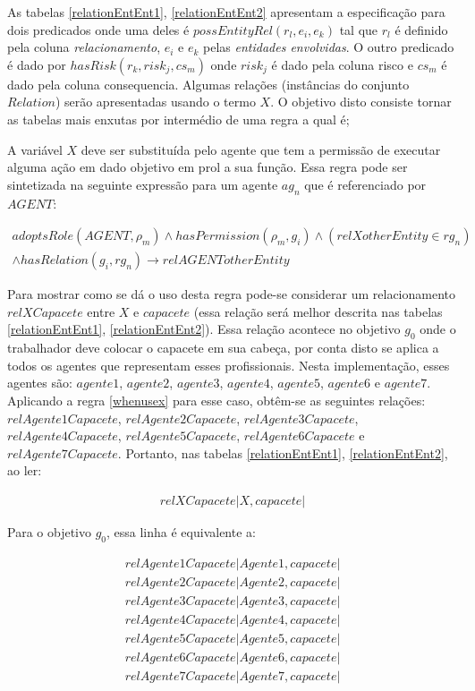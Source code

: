As tabelas \ref{relationEntEnt1}, \ref{relationEntEnt2} apresentam a especificação para dois predicados onde uma deles é $possEntityRel(r_l,e_i,e_k)$ 
tal que $r_l$ é definido pela coluna \textit{relacionamento}, $e_i$ e $e_k$ pelas \textit{entidades envolvidas}. 
O outro predicado é dado por $hasRisk(r_k,risk_j,cs_m)$ onde $risk_j$ é dado pela coluna risco e $cs_m$ é dado pela coluna consequencia. 
Algumas relações (instâncias do conjunto $Relation$) serão apresentadas usando o termo $X$. O objetivo disto consiste tornar as tabelas mais enxutas por intermédio de uma regra a qual é; 

A variável $X$ deve ser substituída pelo agente que tem a permissão de executar alguma ação em dado objetivo em prol a sua função. 
Essa regra pode ser sintetizada na seguinte expressão para um agente $ag_n$ que é referenciado por $AGENT$:

\begin{eqnarray}\label{whenusex} \nonumber
    adoptsRole(AGENT,\rho_m) \wedge hasPermission(\rho_m,g_i) \wedge (relXotherEntity \in rg_n)  \\ 
    \wedge hasRelation(g_i,rg_n) \to relAGENTotherEntity 
\end{eqnarray}


Para mostrar como se dá o uso desta regra pode-se considerar um relacionamento $ relXCapacete$ entre $X$ e $capacete$ (essa relação será melhor descrita nas tabelas \ref{relationEntEnt1}, \ref{relationEntEnt2}). Essa relação acontece no objetivo $g_0$ onde o trabalhador deve colocar o capacete em sua cabeça, por conta disto se aplica a todos os agentes que representam esses profissionais. Nesta implementação, esses agentes são: $agente1$, $agente2$, $agente3$, $agente4$, $agente5$, $agente6$ e $agente7$. Aplicando a regra \ref{whenusex} para esse caso, obtêm-se as seguintes relações: $relAgente1Capacete$, $relAgente2Capacete$, $relAgente3Capacete$, $relAgente4Capacete$, $relAgente5Capacete$, $relAgente6Capacete$ e $relAgente7Capacete$. Portanto, nas tabelas \ref{relationEntEnt1}, \ref{relationEntEnt2}, ao ler:  

\begin{eqnarray}
	relXCapacete | X,capacete |
\end{eqnarray}

Para o objetivo $g_0$, essa linha é equivalente a: 

\begin{eqnarray}
relAgente1Capacete | Agente1 ,capacete | \nonumber \\
relAgente2Capacete | Agente2 ,capacete | \nonumber \\ 
relAgente3Capacete | Agente3 ,capacete | \nonumber \\ 
relAgente4Capacete | Agente4 ,capacete | \nonumber \\
relAgente5Capacete | Agente5 ,capacete | \nonumber \\
relAgente6Capacete | Agente6 ,capacete | \nonumber \\
relAgente7Capacete | Agente7 ,capacete | \nonumber \\
\nonumber \\
\end{eqnarray}

